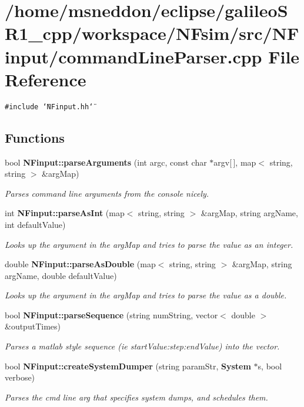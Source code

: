 \section{/home/msneddon/eclipse/galileoSR1\_\-cpp/workspace/NFsim/src/NFinput/commandLineParser.cpp File Reference}
\label{commandLineParser_8cpp}


{\tt \#include \char`\"{}NFinput.hh\char`\"{}}\par
\subsection*{Functions}
\begin{CompactItemize}
\item 
bool {\bf NFinput::parseArguments} (int argc, const char $\ast$argv[$\,$], map$<$ string, string $>$ \&argMap)
\begin{CompactList}\small\item\em Parses command line arguments from the console nicely. \item\end{CompactList}\item 
int {\bf NFinput::parseAsInt} (map$<$ string, string $>$ \&argMap, string argName, int defaultValue)
\begin{CompactList}\small\item\em Looks up the argument in the argMap and tries to parse the value as an integer. \item\end{CompactList}\item 
double {\bf NFinput::parseAsDouble} (map$<$ string, string $>$ \&argMap, string argName, double defaultValue)
\begin{CompactList}\small\item\em Looks up the argument in the argMap and tries to parse the value as a double. \item\end{CompactList}\item 
bool {\bf NFinput::parseSequence} (string numString, vector$<$ double $>$ \&outputTimes)
\begin{CompactList}\small\item\em Parses a matlab style sequence (ie startValue:step:endValue) into the vector. \item\end{CompactList}\item 
bool {\bf NFinput::createSystemDumper} (string paramStr, {\bf System} $\ast$s, bool verbose)
\begin{CompactList}\small\item\em Parses the cmd line arg that specifies system dumps, and schedules them. \item\end{CompactList}\end{CompactItemize}

